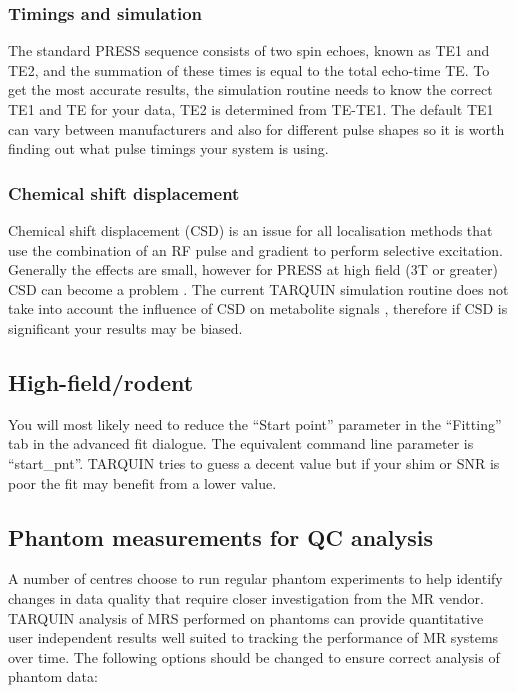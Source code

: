 \documentclass[a4paper,12pt]{article}
\begin{document}
\subsubsection{Timings and simulation}
The standard PRESS sequence consists of two spin echoes, known as TE1 and TE2, and the summation of these times is equal to the total echo-time TE. To get the most accurate results, the simulation routine needs to know the correct TE1 and TE for your data, TE2 is determined from TE-TE1. The default TE1 can vary between manufacturers and also for different pulse shapes so it is worth finding out what pulse timings your system is using.

\subsubsection{Chemical shift displacement}
Chemical shift displacement (CSD) is an issue for all localisation methods that use the combination of an RF pulse and gradient to perform selective excitation. Generally the effects are small, however for PRESS at high field (3T or greater) CSD can become a problem \cite{CSD}. The current TARQUIN simulation routine does not take into account the influence of CSD on metabolite signals \cite{high_f_sims}, therefore if CSD is significant your results may be biased.

\subsection{High-field/rodent}
You will most likely need to reduce the ``Start point'' parameter in the ``Fitting'' tab in the advanced fit dialogue.  The equivalent command line parameter is ``start\_pnt''. TARQUIN tries to guess a decent value but if your shim or SNR is poor the fit may benefit from a lower value.

\subsection{Phantom measurements for QC analysis}
A number of centres choose to run regular phantom experiments to help identify changes in data quality that require closer investigation from the MR vendor. TARQUIN analysis of MRS performed on phantoms can provide quantitative user independent results well suited to tracking the performance of MR systems over time. The following options should be changed to ensure correct analysis of phantom data:
\end{document}
